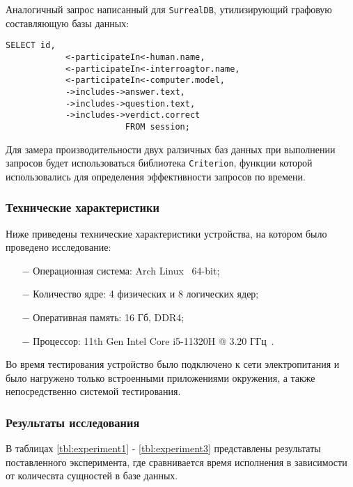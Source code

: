 Аналогичный запрос написанный для \texttt{SurrealDB}, утилизирующий графовую составляющую базы данных:

\begin{lstlisting}
SELECT id,
			<-participateIn<-human.name,
			<-participateIn<-interroagtor.name, 
			<-participateIn<-computer.model, 
			->includes->answer.text, 
			->includes->question.text, 
			->includes->verdict.correct 
						FROM session;
\end{lstlisting}

Для замера производительности двух ралзичных баз данных при выполнении запросов будет использоваться библиотека \texttt{Criterion}, функции которой использовались для определения эффективности запросов по времени.

\subsubsection{Технические характеристики}

Ниже приведены технические характеристики устройства, на котором было проведено исследование:

\begin{itemize}
    \item[$-$] Операционная система: Arch Linux~\cite{arch-linux} 64-bit;
		\item[$-$] Количество ядре: 4 физических и 8 логических ядер;
    \item[$-$] Оперативная память: 16 Гб, DDR4;
    \item[$-$] Процессор: 11th Gen Intel\textsuperscript{\tiny\textregistered} Core\textsuperscript{\tiny\texttrademark} i5-11320H @ 3.20 ГГц~\cite{i5}.
\end{itemize}

Во время тестирования устройство было подключено к сети электропитания и было нагружено только встроенными приложениями окружения, а также непосредственно системой тестирования.

\subsubsection{Результаты исследования}

В таблицах \ref{tbl:experiment1} - \ref{tbl:experiment3} представлены результаты поставленного эксперимента, где сравнивается время исполнения в зависимости от количесвта сущностей в базе данных.

